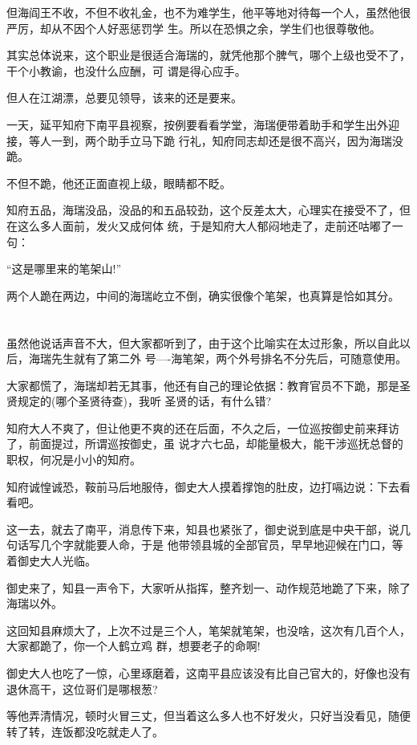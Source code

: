 \documentclass[11pt,a4paper,onecolumn]{article}
\begin{document}
但海阎王不收，不但不收礼金，也不为难学生，他平等地对待每一个人，虽然他很严厉，却从不因个人好恶惩罚学
生。所以在恐惧之余，学生们也很尊敬他。

其实总体说来，这个职业是很适合海瑞的，就凭他那个脾气，哪个上级也受不了，干个小教谕，也没什么应酬，可
谓是得心应手。

但人在江湖漂，总要见领导，该来的还是要来。

一天，延平知府下南平县视察，按例要看看学堂，海瑞便带着助手和学生出外迎接，等人一到，两个助手立马下跪
行礼，知府同志却还是很不高兴，因为海瑞没跪。

不但不跪，他还正面直视上级，眼睛都不眨。

知府五品，海瑞没品，没品的和五品较劲，这个反差太大，心理实在接受不了，但在这么多人面前，发火又成何体
统，于是知府大人郁闷地走了，走前还咕嘟了一句：

``这是哪里来的笔架山!''

两个人跪在两边，中间的海瑞屹立不倒，确实很像个笔架，也真算是恰如其分。

\section[\thesection]{}

虽然他说话声音不大，但大家都听到了，由于这个比喻实在太过形象，所以自此以后，海瑞先生就有了第二外
号----海笔架，两个外号排名不分先后，可随意使用。

大家都慌了，海瑞却若无其事，他还有自己的理论依据：教育官员不下跪，那是圣贤规定的(哪个圣贤待查)，我听
圣贤的话，有什么错?

知府大人不爽了，但让他更不爽的还在后面，不久之后，一位巡按御史前来拜访了，前面提过，所谓巡按御史，虽
说才六七品，却能量极大，能干涉巡抚总督的职权，何况是小小的知府。

知府诚惶诚恐，鞍前马后地服侍，御史大人摸着撑饱的肚皮，边打嗝边说：下去看看吧。

这一去，就去了南平，消息传下来，知县也紧张了，御史说到底是中央干部，说几句话写几个字就能要人命，于是
他带领县城的全部官员，早早地迎候在门口，等着御史大人光临。

御史来了，知县一声令下，大家听从指挥，整齐划一、动作规范地跪了下来，除了海瑞以外。

这回知县麻烦大了，上次不过是三个人，笔架就笔架，也没啥，这次有几百个人，大家都跪了，你一个人鹤立鸡
群，想要老子的命啊!

御史大人也吃了一惊，心里琢磨着，这南平县应该没有比自己官大的，好像也没有退休高干，这位哥们是哪根葱?

等他弄清情况，顿时火冒三丈，但当着这么多人也不好发火，只好当没看见，随便转了转，连饭都没吃就走人了。
\end{document}
